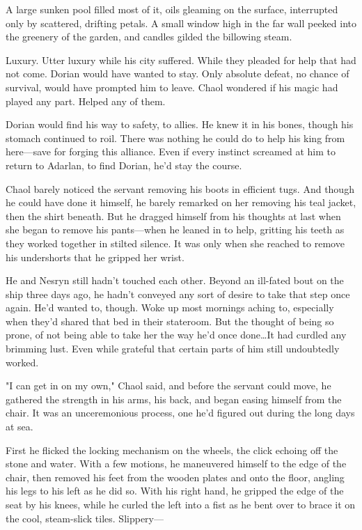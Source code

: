 A large sunken pool filled most of it, oils gleaming on the surface, interrupted only by scattered, drifting petals.
A small window high in the far wall peeked into the greenery of the garden, and candles gilded the billowing steam.

Luxury.
Utter luxury while his city suffered.
While they pleaded for help that had not come.
Dorian would have wanted to stay.
Only absolute defeat, no chance of survival, would have prompted him to leave.
Chaol wondered if his magic had played any part.
Helped any of them.

Dorian would find his way to safety, to allies.
He knew it in his bones, though his stomach continued to roil.
There was nothing he could do to help his king from here---save for forging this alliance.
Even if every instinct screamed at him to return to Adarlan, to find Dorian, he'd stay the course.

Chaol barely noticed the servant removing his boots in efficient tugs.
And though he could have done it himself, he barely remarked on her removing his teal jacket, then the shirt beneath.
But he dragged himself from his thoughts at last when she began to remove his pants---when he leaned in to help, gritting his teeth as they worked together in stilted silence.
It was only when she reached to remove his undershorts that he gripped her wrist.

He and Nesryn still hadn't touched each other.
Beyond an ill-fated bout on the ship three days ago, he hadn't conveyed any sort of desire to take that step once again.
He'd wanted to, though.
Woke up most mornings aching to, especially when they'd shared that bed in their stateroom.
But the thought of being so prone, of not being able to take her the way he'd once done\ldots It had curdled any brimming lust.
Even while grateful that certain parts of him still undoubtedly worked.

"I can get in on my own," Chaol said, and before the servant could move, he gathered the strength in his arms, his back, and began easing himself from the chair.
It was an unceremonious process, one he'd figured out during the long days at sea.

First he flicked the locking mechanism on the wheels, the click echoing off the stone and water.
With a few motions, he maneuvered himself to the edge of the chair, then removed his feet from the wooden plates and onto the floor, angling his legs to his left as he did so.
With his right hand, he gripped the edge of the seat by his knees, while he curled the left into a fist as he bent over to brace it on the cool, steam-slick tiles.
Slippery---

